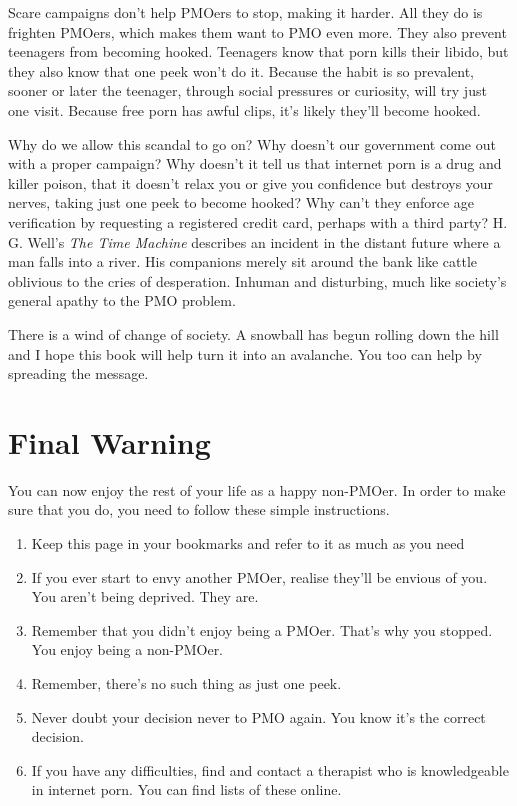 \documentclass[easypeasy.tex]{subfiles}
\begin{document}
Scare campaigns don't help PMOers to stop, making it harder. All they do is frighten PMOers, which makes them want to PMO even more. They also prevent teenagers from becoming hooked. Teenagers know that porn kills their libido, but they also know that one peek won't do it. Because the habit is so prevalent, sooner or later the teenager, through social pressures or curiosity, will try just one visit. Because free porn has awful clips, it's likely they'll become hooked.

Why do we allow this scandal to go on? Why doesn't our government come out with a proper campaign? Why doesn't it tell us that internet porn is a drug and killer poison, that it doesn't relax you or give you confidence but destroys your nerves, taking just one peek to become hooked? Why can't they enforce age verification by requesting a registered credit card, perhaps with a third party? H. G. Well's \textit{The Time Machine} describes an incident in the distant future where a man falls into a river. His companions merely sit around the bank like cattle oblivious to the cries of desperation. Inhuman and disturbing, much like society's general apathy to the PMO problem.

There is a wind of change of society. A snowball has begun rolling down the hill and I hope this book will help turn it into an avalanche. You too can help by spreading the message.

\section{Final Warning}

You can now enjoy the rest of your life as a happy non-PMOer. In order to make sure that you do, you need to follow these simple instructions.
\begin{enumerate}
  \item Keep this page in your bookmarks and refer to it as much as you need
  \item If you ever start to envy another PMOer, realise they'll be envious of you. You aren't being deprived. They are.
  \item Remember that you didn't enjoy being a PMOer. That's why you stopped. You enjoy being a non-PMOer.
  \item Remember, there's no such thing as just one peek.
  \item Never doubt your decision never to PMO again. You know it's the correct decision.
  \item If you have any difficulties, find and contact a therapist who is knowledgeable in internet porn. You can find lists of these online.
\end{enumerate}
\end{document}
